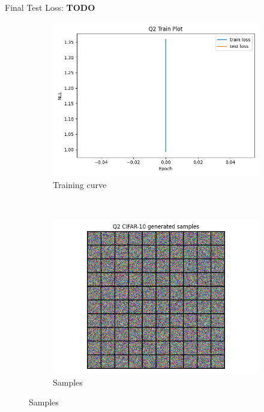 \documentclass{article}
\begin{document}
\newpage
{} \\

    
Final Test Loss: \textbf{TODO} \\
\begin{figure}[H]
    \centering
    \begin{subfigure}{0.7\textwidth}
        \centering
        \includegraphics[width=\textwidth]{figures/q2_train_plot.png}
        \caption{Training curve}
    \end{subfigure}
    \\
    \begin{subfigure}{0.7\textwidth}
        \centering
        \includegraphics[width=\textwidth]{figures/q2_samples.png}
        \caption{Samples}
    \end{subfigure}
    
\end{figure}
\end{document}
